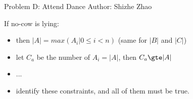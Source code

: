 \begin{frame}{Problem D: Attend Dance}
\small Author: Shizhe Zhao

If no-cow is lying:
\begin{itemize}
  \item <2-> then $|A|=max(A_i | 0 \le i < n)$ (same for $|B|$ and $|C|$)
  \item <3-> let $C_a$ be the number of $A_i = |A|$, then $C_a \gte |A|$
  \item <4-> ...
  \item <5-> identify these constraints, and all of them must be true.
\end{itemize}
\end{frame}
